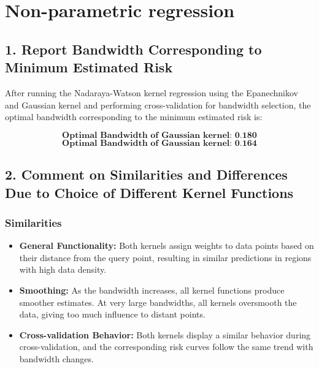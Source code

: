\vspace{1.2cm}
\section{Non-parametric regression}
\subsection{1. Report Bandwidth Corresponding to Minimum Estimated Risk}

After running the Nadaraya-Watson kernel regression using the Epanechnikov and Gaussian kernel and performing cross-validation for bandwidth selection, the optimal bandwidth corresponding to the minimum estimated risk is:

\[
\textbf{Optimal Bandwidth of Gaussian kernel: 0.180}
\]
\[
\textbf{Optimal Bandwidth of Gaussian kernel: 0.164}
\]

\subsection{2. Comment on Similarities and Differences Due to Choice of Different Kernel Functions}

\subsubsection{Similarities}
\begin{itemize}
    \item \textbf{General Functionality:} Both kernels assign weights to data points based on their distance from the query point, resulting in similar predictions in regions with high data density.
    \item \textbf{Smoothing:} As the bandwidth increases, all kernel functions produce smoother estimates. At very large bandwidths, all kernels oversmooth the data, giving too much influence to distant points.
    \item \textbf{Cross-validation Behavior:} Both kernels display a similar behavior during cross-validation, and the corresponding risk curves follow the same trend with bandwidth changes.
\end{itemize}

